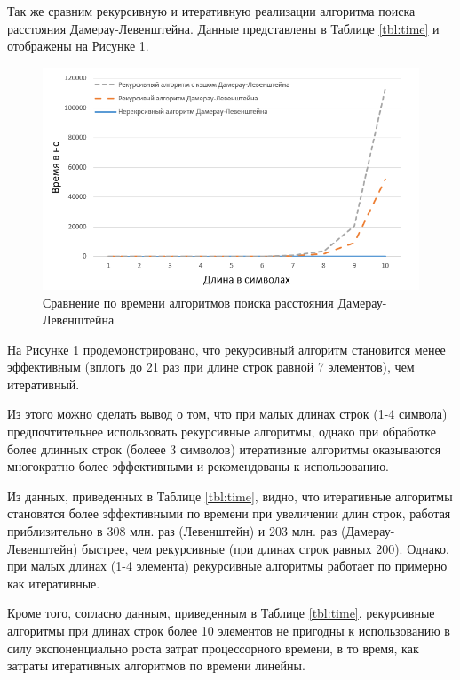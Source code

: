 Так же сравним рекурсивную и итеративную реализации алгоритма поиска расстояния Дамерау-Левенштейна. Данные представлены в Таблице \ref{tbl:time} и отображены на Рисунке \ref{plt:time_02}.

\begin{figure}[h]
	\centering
	\includegraphics[height=0.3\textheight]{img/diag_02.png}
	\caption{Сравнение по времени алгоритмов поиска расстояния Дамерау-Левенштейна}
	\label{plt:time_02}
\end{figure}

На Рисунке \ref{plt:time_02} продемонстрировано, что рекурсивный алгоритм становится менее эффективным (вплоть до 21 раз при длине строк равной 7 элементов), чем итеративный.

Из этого можно сделать вывод о том, что при малых длинах строк (1-4 символа) предпочтительнее использовать рекурсивные алгоритмы, однако при обработке более длинных строк (болеее 3 символов) итеративные алгоритмы оказываются многократно более эффективными и рекомендованы к использованию.

Из данных, приведенных в  Таблице \ref{tbl:time}, видно, что итеративные алгоритмы становятся более эффективными по времени при увеличении длин строк, работая приблизительно в 308 млн. раз (Левенштейн) и 203 млн. раз (Дамерау-Левенштейн) быстрее, чем рекурсивные (при длинах строк равных 200). Однако, при малых длинах (1-4 элемента) рекурсивные алгоритмы работает по примерно как итеративные.

Кроме того, согласно данным, приведенным в Таблице \ref{tbl:time}, рекурсивные алгоритмы при длинах строк более 10 элементов не пригодны к использованию в силу экспоненциально роста затрат процессорного времени, в то время, как затраты итеративных алгоритмов по времени линейны.

